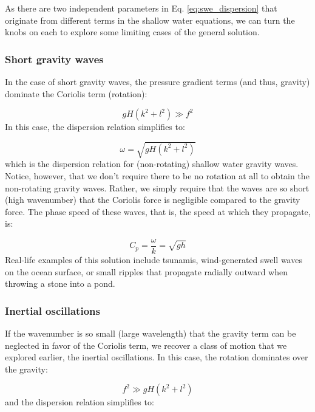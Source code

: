 \documentclass[12pt]{article}
\numberwithin{equation}{section}
\numberwithin{figure}{section}
\numberwithin{table}{section}
\begin{document}
As there are two independent parameters in Eq. \ref{eq:swe_dispersion} that
originate from different terms in the shallow water equations, we can turn the
knobs on each to explore some limiting cases of the general solution.

\subsubsection{Short gravity waves}

In the case of short gravity waves, the pressure gradient terms (and thus,
gravity) dominate the Coriolis term (rotation):

\begin{equation}
  gH(k^2 + l^2) \gg f^2
\end{equation}
In this case, the dispersion relation simplifies to:

\begin{equation}
  \omega = \sqrt{gH(k^2 + l^2)}
\end{equation}
which is the dispersion relation for (non-rotating) shallow water gravity waves.
Notice, however, that we don't require there to be no rotation at all to obtain
the non-rotating gravity waves.
Rather, we simply require that the waves are so short (high wavenumber) that the
Coriolis force is negligible compared to the gravity force.
The phase speed of these waves, that is, the speed at which they propagate, is:

\begin{equation}
  C_p = \frac{\omega}{k} = \sqrt{g h}
  \label{eq:shallow_water_phase_speed}
\end{equation}
Real-life examples of this solution include tsunamis, wind-generated swell
waves on the ocean surface, or small ripples that propagate radially outward
when throwing a stone into a pond.

\subsubsection{Inertial oscillations}

If the wavenumber is so small (large wavelength) that the gravity term can be
neglected in favor of the Coriolis term, we recover a class of motion that we
explored earlier, the inertial oscillations.
In this case, the rotation dominates over the gravity:

\begin{equation}
  f^2 \gg gH(k^2 + l^2)
\end{equation}
and the dispersion relation simplifies to:
\end{document}
